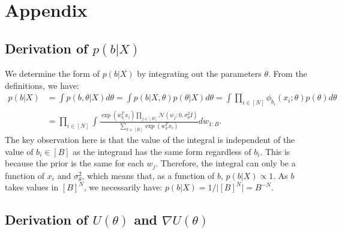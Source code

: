 \section{Appendix}

\subsection{Derivation of {\boldmath $p(b|X)$}}
\label{appdx:b|x}

We determine the form of $p(b| X)$ by integrating
out the parameters $\theta$. From the definitions, we have:
%
\begin{align*}
	p(b | X) 
	&= \int p(b , \theta| X) d\theta 
	= \int p(b | X, \theta) p(\theta | X) d\theta
	= \int \prod_{i \in [N] } \phi_{b_i}(x_i; \theta) p(\theta) d\theta \\
	&= \prod_{i \in [N]} \int \frac{\exp(w_{b_i}^T x_i) \prod_{j \in [B]} \mathcal{N}(w_j; 0, \sigma_\theta^2 I)}{\sum_{k \in [B]} \exp(w_{k}^T x_i)} dw_{1:B}.
\end{align*}
%
The key observation here is that 
the value of the integral is independent
of the value of $b_i \in [B]$ as
the integrand has the same form regardless of $b_i$. This is
because the prior is the same for each $w_j$. 
Therefore, the integral can only be a function of $x_i$ and $\sigma_\theta^2$,
which means that, as a function of $b$, $p(b|X)\propto 1$. As
$b$ takes values in $[B]^N$, we necessarily have:
$p(b | X) =1/\big|[B]^N\big|=B^{-N}$.

\subsection{Derivation of {\boldmath $U(\theta)$} and {\boldmath $\nabla U(\theta)$}}
\label{appdx:form-U}

